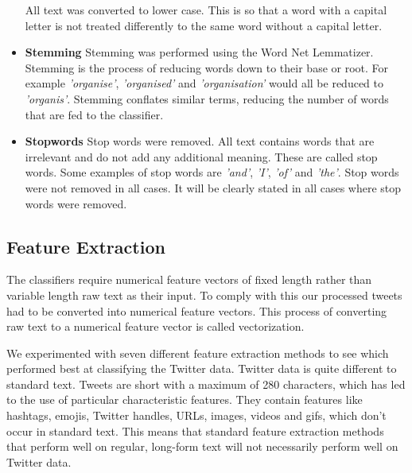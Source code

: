 \begin{itemize}
    All text was converted to lower case. This is so that a word with a capital letter is not treated differently to the same word without a capital letter.
    \item \textbf{Stemming}\newline
    Stemming was performed using the Word Net Lemmatizer. Stemming is the process of reducing words down to their base or root. For example \emph{'organise'}, \emph{'organised'} and \emph{'organisation'} would all be reduced to \emph{'organis'}. Stemming conflates similar terms, reducing the number of words that are fed to the classifier.
    \newline
    \item \textbf{Stopwords}\newline
    Stop words were removed. All text contains words that are irrelevant and do not add any additional meaning. These are called stop words. Some examples of stop words are \emph{'and'}, \emph{'I'}, \emph{'of'} and \emph{'the'}. Stop words were not removed in all cases. It will be clearly stated in all cases where stop words were removed.
\end{itemize}



\subsection{Feature Extraction}

The classifiers require numerical feature vectors of fixed length rather than variable length raw text as their input. To comply with this our processed tweets had to be converted into numerical feature vectors. This process of converting raw text to a numerical feature vector is called vectorization.

We experimented with seven different feature extraction methods to see which performed best at classifying the Twitter data. Twitter data is quite different to standard text. Tweets are short with a maximum of 280 characters, which has led to the use of particular characteristic features. They contain features like hashtags, emojis, Twitter handles, URLs, images, videos and gifs, which don't occur in standard text. This means that standard feature extraction methods that perform well on regular, long-form text will not necessarily perform well on Twitter data.


